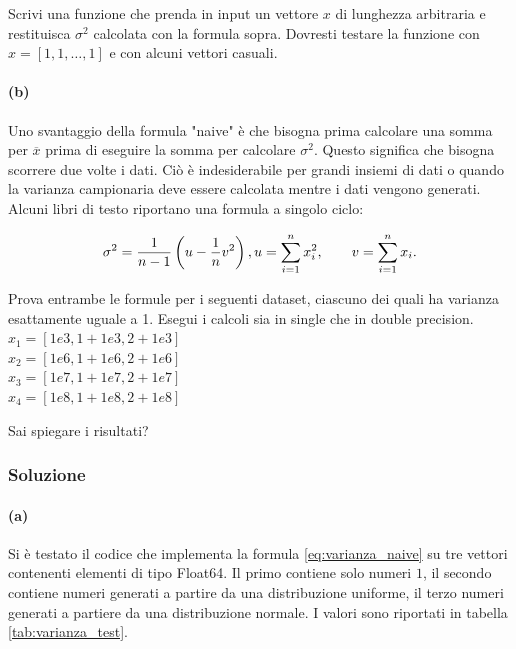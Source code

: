 \documentclass[letterpaper, 12pt]{article}
\begin{document}
Scrivi una funzione che prenda in input un vettore $x$ di lunghezza arbitraria e restituisca $\sigma^2$ calcolata 
con la formula sopra. 
Dovresti testare la funzione con $x=[1,1,\ldots,1]$ e con alcuni vettori casuali.

\paragraph{(b)} Uno svantaggio della formula "naive" è che bisogna prima calcolare una somma per $\overline{x}$ prima di eseguire la somma per calcolare $\sigma^2$. 
Questo significa che bisogna scorrere due volte i dati. 
Ciò è indesiderabile per grandi insiemi di dati o quando la varianza campionaria deve essere calcolata mentre i dati vengono generati. 
Alcuni libri di testo riportano una formula a singolo ciclo:

\begin{equation}
    \sigma^2 = \frac{1}{n-1} \left( u - \frac{1}{n}v^2 \right),\\
    u  = \sum_{i=1}^n x_i^2, 
    \qquad
    v = \sum_{i=1}^n x_i.  
    \label{eq:varianza_eff}  
\end{equation}

Prova entrambe le formule per i seguenti dataset, ciascuno dei quali ha varianza esattamente uguale a 1. 
Esegui i calcoli sia in single che in double precision. \\
$ x_1 = [ 1e3, 1+1e3, 2+1e3 ]$ \\
$ x_2 = [ 1e6, 1+1e6, 2+1e6 ]$ \\
$ x_3 = [ 1e7, 1+1e7, 2+1e7 ]$ \\
$ x_4 = [ 1e8, 1+1e8, 2+1e8 ]$ 

Sai spiegare i risultati?

\subsubsection{Soluzione}
\paragraph{(a) } Si è testato il codice che implementa la formula \ref{eq:varianza_naive} su tre vettori contenenti
elementi di tipo Float64. Il primo contiene solo numeri $1$, il secondo contiene numeri generati a partire 
da una distribuzione uniforme, il terzo numeri generati a partiere da una distribuzione normale. I valori sono 
riportati in tabella \ref{tab:varianza_test}.
\end{document}
